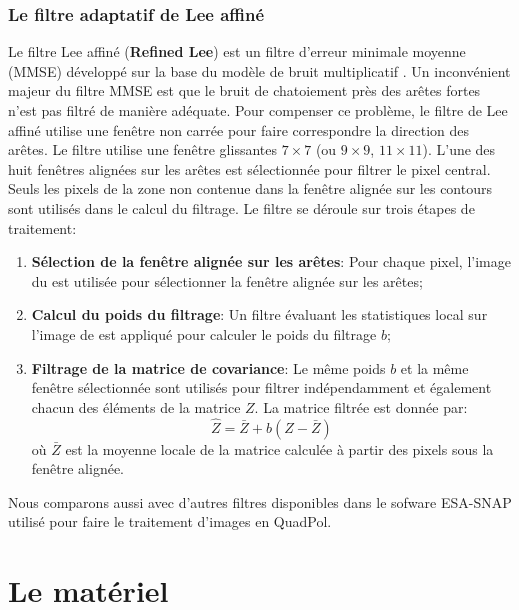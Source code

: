 \subsubsection{Le filtre adaptatif de Lee affiné}

 Le filtre Lee affiné (\textbf{Refined Lee}) est un filtre d’erreur minimale moyenne (MMSE) développé sur la base du modèle de bruit multiplicatif \cite{Lee1999}. Un inconvénient majeur du filtre MMSE est que le bruit de chatoiement près des arêtes fortes n’est pas filtré de manière adéquate. Pour compenser ce problème, le filtre de Lee affiné utilise une fenêtre non carrée pour faire correspondre la direction des arêtes. Le filtre utilise une fenêtre glissantes $7 \times 7$ (ou $9 \times 9$, $11 \times 11$). L'une des huit fenêtres alignées sur les arêtes est sélectionnée pour filtrer le pixel central. Seuls les pixels de la zone non contenue dans la fenêtre alignée sur les contours sont utilisés dans le calcul du filtrage. Le filtre se déroule sur trois étapes de traitement:

\begin{enumerate}
    \item \textbf{Sélection de la fenêtre alignée sur les arêtes}:
    Pour chaque pixel, l'image du \itspan est utilisée pour sélectionner la fenêtre alignée sur les arêtes;
    \item \textbf{Calcul du poids du filtrage}: Un filtre évaluant les statistiques local sur l'image de \itspan est appliqué pour calculer le poids du filtrage $b$;
    \item \textbf{Filtrage de la matrice de covariance}:  Le même poids $b$ et la même fenêtre sélectionnée sont utilisés pour filtrer indépendamment et également chacun des éléments de la matrice $Z$.  La matrice filtrée est donnée par:
    \begin{equation}
        \hat{Z} = \bar{Z} + b (Z-\bar{Z})   
    \end{equation}
    où  $\bar{Z}$ est la moyenne locale de la matrice calculée à partir des pixels sous la fenêtre alignée.

\end{enumerate}
Nous comparons aussi avec d'autres filtres disponibles dans le sofware ESA-SNAP utilisé pour faire le traitement d'images en QuadPol.

\section{Le matériel} \label{sec:hardware_software}

